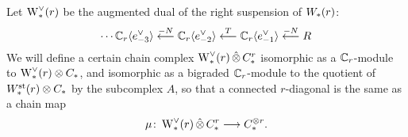 Let $\operatorname{W}^\vee_{*}(r)$ be the augmented dual of the right suspension of $W_{*}(r)$:
\[
\dotsb
\mathbb{C}_r\langle e_{-3}^\vee\rangle
\overset{-N}{\longleftarrow}
\mathbb{C}_r\langle e_{-2}^\vee\rangle
\overset{T}{\longleftarrow}
\mathbb{C}_r\langle e_{-1}^{\vee}\rangle
\overset{-N}{\longleftarrow}
R
\]
We will define a certain chain complex $\operatorname{W}^\vee_{*}(r)\operatorname{\hat{\otimes}} C^{r}_{*}$ isomorphic as a $\mathbb{C}_r$-module to $\operatorname{W}^\vee_{*}(r)\otimes C_{*}$, and isomorphic as a bigraded $\mathbb{C}_r$-module to the quotient of $W^{\mathrm{st}}_{*}(r)\otimes C_{*}$ by the subcomplex $A$, so that a connected $r$-diagonal is the same as a chain map
\[
    \mu\colon \operatorname{W}^\vee_{*}(r)\operatorname{\hat{\otimes}} C^{r}_{*}\longrightarrow C_{*}^{\otimes r}.
\]




